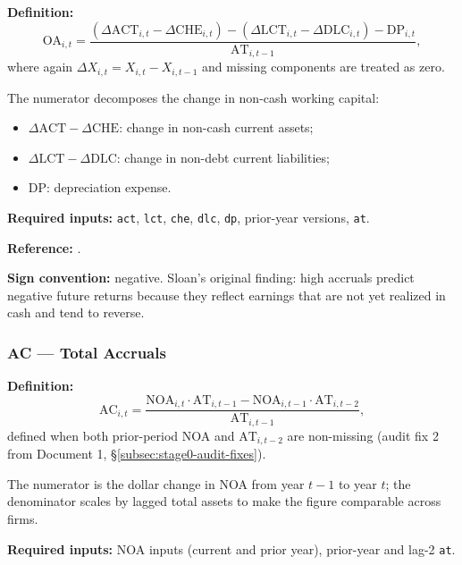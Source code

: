 \textbf{Definition:}
\begin{equation}
\mathrm{OA}_{i,t} = \frac{(\Delta\mathrm{ACT}_{i,t} - \Delta\mathrm{CHE}_{i,t})
                          - (\Delta\mathrm{LCT}_{i,t} - \Delta\mathrm{DLC}_{i,t})
                          - \mathrm{DP}_{i,t}}
                          {\mathrm{AT}_{i,t-1}},
\label{eq:oa}
\end{equation}
where again $\Delta X_{i,t} = X_{i,t} - X_{i,t-1}$ and missing
components are treated as zero.

The numerator decomposes the change in non-cash working capital:
\begin{itemize}
\item $\Delta \mathrm{ACT} - \Delta \mathrm{CHE}$: change in non-cash
      current assets;
\item $\Delta \mathrm{LCT} - \Delta \mathrm{DLC}$: change in
      non-debt current liabilities;
\item $\mathrm{DP}$: depreciation expense.
\end{itemize}

\textbf{Required inputs:} \texttt{act}, \texttt{lct}, \texttt{che},
\texttt{dlc}, \texttt{dp}, prior-year versions, \texttt{at}.

\textbf{Reference:} \cite{Sloan1996}.

\textbf{Sign convention:} negative. Sloan's original finding: high
accruals predict negative future returns because they reflect earnings
that are not yet realized in cash and tend to reverse.

\subsubsection{AC --- Total Accruals}

\textbf{Definition:}
\begin{equation}
\mathrm{AC}_{i,t} = \frac{\mathrm{NOA}_{i,t} \cdot \mathrm{AT}_{i,t-1}
                          - \mathrm{NOA}_{i,t-1} \cdot \mathrm{AT}_{i,t-2}}
                          {\mathrm{AT}_{i,t-1}},
\label{eq:ac}
\end{equation}
defined when both prior-period NOA and $\mathrm{AT}_{i,t-2}$ are
non-missing (audit fix 2 from Document 1, \S\ref{subsec:stage0-audit-fixes}).

The numerator is the dollar change in NOA from year $t-1$ to year $t$;
the denominator scales by lagged total assets to make the figure
comparable across firms.

\textbf{Required inputs:} NOA inputs (current and prior year),
prior-year and lag-2 \texttt{at}.

